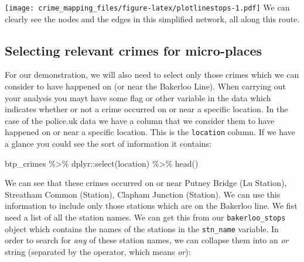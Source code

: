 \documentclass[
  krantz2]{krantz}
\makeatletter
\newenvironment{Shaded}{\begin{snugshade}}{\end{snugshade}}
\newcommand{\AttributeTok}[1]{\textcolor[rgb]{0.61,0.61,0.61}{#1}}
\newcommand{\FunctionTok}[1]{\textcolor[rgb]{0,0,0}{#1}}
\newcommand{\NormalTok}[1]{#1}
\newcommand{\OtherTok}[1]{\textcolor[rgb]{0.37,0.37,0.37}{#1}}
\newcommand{\SpecialCharTok}[1]{\textcolor[rgb]{0,0,0}{#1}}
\newcommand{\StringTok}[1]{\textcolor[rgb]{0.5,0.5,0.5}{#1}}
\newenvironment{kframe}{%
\medskip{}
\setlength{\fboxsep}{.8em}
 \def\at@end@of@kframe{}%
 \ifinner\ifhmode%
  \def\at@end@of@kframe{\end{minipage}}%
  \begin{minipage}{\columnwidth}%
 \fi\fi%
 \def\FrameCommand##1{\hskip\@totalleftmargin \hskip-\fboxsep
 \colorbox{shadecolor}{##1}\hskip-\fboxsep
     \hskip-\linewidth \hskip-\@totalleftmargin \hskip\columnwidth}%
 \MakeFramed {\advance\hsize-\width
   \@totalleftmargin\z@ \linewidth\hsize
   \@setminipage}}%
 {\par\unskip\endMakeFramed%
 \at@end@of@kframe}
\renewenvironment{Shaded}{\begin{kframe}}{\end{kframe}}
\makeatother
\begin{document}
\texttt{[image: crime\_mapping\_files/figure-latex/plotlinestops-1.pdf]}
We can clearly see the nodes and the edges in this simplified network, all along this route.

\hypertarget{selecting-relevant-crimes-for-micro-places}{%
\subsection{Selecting relevant crimes for micro-places}\label{selecting-relevant-crimes-for-micro-places}}

For our demonstration, we will also need to select only those crimes which we can consider to have happened on (or near the Bakerloo Line). When carrying out your analysis you mayt have some flag or other variable in the data which indicates whether or not a crime occurred on or near a specific location. In the case of the police.uk data we have a column that we consider them to have happened on or near a specific location. This is the \texttt{location} column. If we have a glance you could see the sort of information it contains:

\begin{Shaded}
\begin{Highlighting}[]
\NormalTok{btp\_crimes }\SpecialCharTok{\%\textgreater{}\%}\NormalTok{ dplyr}\SpecialCharTok{::}\FunctionTok{select}\NormalTok{(location) }\SpecialCharTok{\%\textgreater{}\%} \FunctionTok{head}\NormalTok{()}
\end{Highlighting}
\end{Shaded}

We can see that these crimes occurred on or near Putney Bridge (Lu Station), Streatham Common (Station), Clapham Junction (Station). We can use this information to include only those stations which are on the Bakerloo line. We fist need a list of all the station names. We can get this from our \texttt{bakerloo\_stops} object which contains the names of the stations in the \texttt{stn\_name} variable. In order to search for \emph{any} of these station names, we can collapse them into an \emph{or} string (separated by the \texttt{\textbar{}} operator, which means \emph{or}):

\begin{Shaded}
\end{Shaded}
\end{document}
